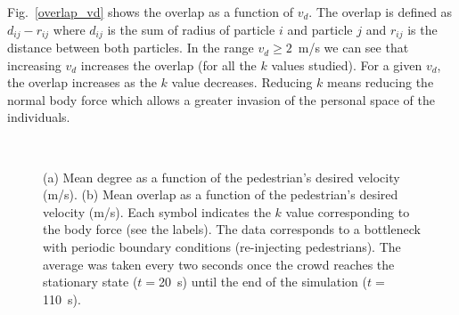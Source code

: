 \documentclass[preprint,12pt]{elsarticle}
\begin{document}
Fig.~\ref{overlap_vd} shows the overlap as a function of $v_d$. The overlap is defined as $d_{ij}-r_{ij}$ where $d_{ij}$ is the sum of radius of particle $i$ and particle $j$ and $r_{ij}$  is the distance between both particles. In the range $v_d \geq 2$~m/s we can see that increasing $v_d$ increases the overlap (for all the $k$ values studied). For a given $v_d$, the overlap increases as the $k$ value decreases. Reducing $k$ means reducing the normal body force which allows a greater invasion of the personal space of the individuals.\\  


\begin{figure}[!htbp]
\centering
    \ 
    \\
\caption[width=0.47\columnwidth]{(a) Mean degree as a function of the pedestrian’s desired velocity (m/s). (b) Mean overlap as a function of the pedestrian’s desired velocity (m/s). Each symbol indicates the $k$ value corresponding to the body force (see the labels). The data corresponds to a bottleneck with periodic boundary conditions (re-injecting pedestrians). The average was taken every two seconds once the crowd reaches the stationary state ($t=$20~s) until the end of the simulation ($t=$110~s).}
\label{degree_overlap_vd}
\end{figure}
\end{document}
